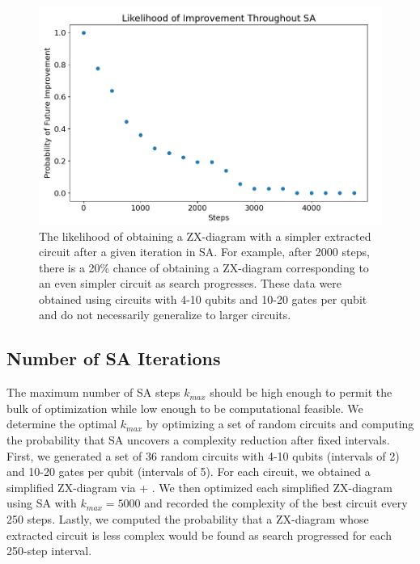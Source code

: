 \begin{figure}[t]
\centering
\includegraphics[width=13cm]{img/iter-likelihood.png}
\caption{
  The likelihood of obtaining a ZX-diagram with a simpler extracted circuit after a given iteration in SA.
  For example, after 2000 steps, there is a 20\% chance of obtaining a ZX-diagram corresponding to an even simpler circuit as search progresses.
  These data were obtained using circuits with 4-10 qubits and 10-20 gates per qubit and do not necessarily generalize to larger circuits.
}
\label{fig:iter-likelihood}
\end{figure}

\subsection*{Number of SA Iterations}

The maximum number of SA steps $k_{max}$ should be high enough to permit the bulk of optimization while low enough to be computational feasible.
We determine the optimal $k_{max}$ by optimizing a set of random circuits and computing the probability that SA uncovers a complexity reduction after fixed intervals.
First, we generated a set of 36 random circuits with 4-10 qubits (intervals of 2) and 10-20 gates per qubit (intervals of 5).
For each circuit, we obtained a simplified ZX-diagram via  + .
We then optimized each simplified ZX-diagram using SA with $k_{max} = 5000$ and recorded the complexity of the best circuit every 250 steps.
Lastly, we computed the probability that a ZX-diagram whose extracted circuit is less complex would be found as search progressed for each 250-step interval.

